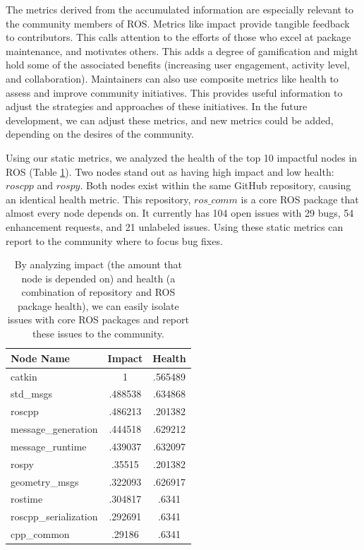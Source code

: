 \documentclass[letterpaper, 10 pt, conference]{ieeeconf}  %
\begin{document}
The metrics derived from the accumulated information are especially relevant to the community members of ROS. Metrics like impact provide tangible feedback to contributors. This calls attention to the efforts of those who excel at package maintenance, and motivates others. This adds a degree of gamification and might hold some of the associated benefits (increasing user engagement, activity level, and collaboration). Maintainers can also use composite metrics like health to assess and improve community initiatives. This provides useful information to adjust the strategies and approaches of these initiatives. In the future development, we can adjust these metrics, and new metrics could be added, depending on the desires of the community.

Using our static metrics, we analyzed the health of the top 10 impactful nodes in ROS (Table \ref{ImpactHealthTable}). Two nodes stand out as having high impact and low health: $roscpp$ and $rospy$. Both nodes exist within the same GitHub repository, causing an identical health metric. This repository, $ros\_comm$ is a core ROS package that almost every node depends on. It currently has 104 open issues with 29 bugs, 54 enhancement requests, and 21 unlabeled issues. Using these static metrics can report to the community where to focus bug fixes.

\begin{table}
\centering
\begin{tabular}{|l|c|c|}
\hline
Node Name & Impact & Health \\
\hline
catkin & 1 & .565489 \\
\hline
std\_msgs & .488538 & .634868 \\
\hline
roscpp & .486213 & .201382 \\
\hline
message\_generation & .444518 & .629212 \\
\hline
message\_runtime & .439037 & .632097\\
\hline
rospy & .35515 & .201382 \\
\hline
geometry\_msgs & .322093 & .626917 \\
\hline
rostime & .304817 & .6341 \\
\hline
roscpp\_serialization & .292691 & .6341 \\
\hline
cpp\_common & .29186 & .6341 \\
\hline
\end{tabular}
\caption{By analyzing impact (the amount that node is depended on) and health (a combination of repository and ROS package health), we can easily isolate issues with core ROS packages and report these issues to the community.}
\label{ImpactHealthTable}
\end{table}
\end{document}
